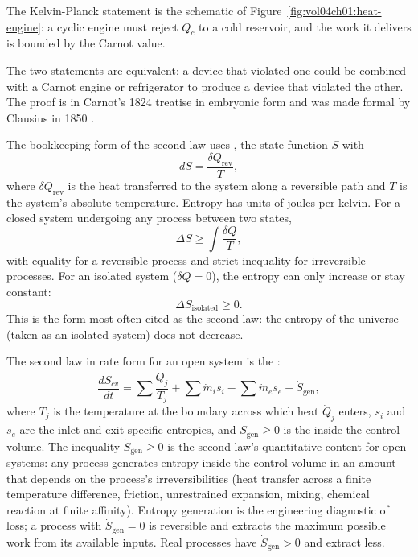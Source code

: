 The Kelvin-Planck statement is the schematic of
Figure~\ref{fig:vol04ch01:heat-engine}: a cyclic engine must reject
$Q_c$ to a cold reservoir, and the work it delivers is bounded by the
Carnot value.



The two statements are equivalent: a device that violated one could be
combined with a Carnot engine or refrigerator to produce a device that
violated the other. The proof is in Carnot's 1824 treatise in
embryonic form \cite{hist:carnot1824} and was made formal by Clausius
in 1850 \cite{hist:clausius1850}.

The bookkeeping form of the second law uses , the
state function $S$ with
\[
dS = \frac{\delta Q_{\text{rev}}}{T},
\]
where $\delta Q_{\text{rev}}$ is the heat transferred to the system
along a reversible path and $T$ is the system's absolute temperature.
Entropy has units of joules per kelvin. For a closed system
undergoing any process between two states,
\[
\Delta S \geq \int \frac{\delta Q}{T},
\]
with equality for a reversible process and strict inequality for
irreversible processes. For an isolated system ($\delta Q = 0$), the
entropy can only increase or stay constant:
\[
\Delta S_{\text{isolated}} \geq 0.
\]
This is the form most often cited as the second law: the entropy of
the universe (taken as an isolated system) does not decrease.

The second law in rate form for an open system is the :
\[
\frac{dS_{cv}}{dt} = \sum \frac{\dot{Q}_j}{T_j} + \sum \dot{m}_i s_i -
\sum \dot{m}_e s_e + \dot{S}_{\text{gen}},
\]
where $T_j$ is the temperature at the boundary across which heat
$\dot{Q}_j$ enters, $s_i$ and $s_e$ are the inlet and exit specific
entropies, and $\dot{S}_{\text{gen}} \geq 0$ is the
 inside the control volume. The
inequality $\dot{S}_{\text{gen}} \geq 0$ is the second law's
quantitative content for open systems: any process generates entropy
inside the control volume in an amount that depends on the process's
irreversibilities (heat transfer across a finite temperature
difference, friction, unrestrained expansion, mixing, chemical
reaction at finite affinity). Entropy generation is the engineering
diagnostic of loss; a process with $\dot{S}_{\text{gen}} = 0$ is
reversible and extracts the maximum possible work from its available
inputs. Real processes have $\dot{S}_{\text{gen}} > 0$ and extract
less.

